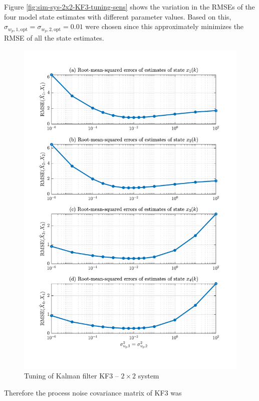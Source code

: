 Figure \ref{fig:sim-sys-2x2-KF3-tuning-sens} shows the variation in the \gls{RMSE}s of the four model state estimates with different parameter values. Based on this, $\sigma_{w_p,1,\text{opt}}=\sigma_{w_p,2,\text{opt}}=0.01$ were chosen since this approximately minimizes the \gls{RMSE} of all the state estimates.
\begin{figure}[htp]
	\centering
	\includegraphics[width=14cm]{images/rod_obs_sim2_3KF_Q_seed_6.pdf}
	\caption{Tuning of Kalman filter KF3 – $2\times2$ system}
	\label{fig:sim-sys-2x2-KF3-tuning}
\end{figure}
Therefore the process noise covariance matrix of KF3 was
